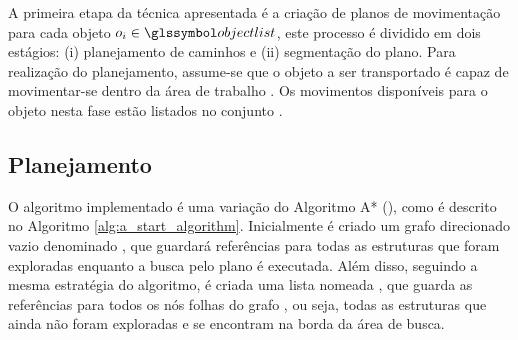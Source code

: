 A primeira etapa da técnica apresentada é a criação de planos de movimentação para cada objeto $\object{i} \in \sy{objectlist}$, este processo é dividido em dois estágios: (i) planejamento de caminhos e (ii) segmentação do plano.
Para realização do planejamento, assume-se que o objeto a ser transportado é capaz de movimentar-se dentro da área de trabalho .
Os movimentos disponíveis para o objeto nesta fase estão listados no conjunto .


\subsection{Planejamento} %
\label{sub:planejamento}


O algoritmo implementado é uma variação do Algoritmo A* (\cite{Hart1968}), como é descrito no Algoritmo \ref{alg:a_start_algorithm}.
Inicialmente é criado um grafo direcionado vazio denominado , que guardará referências para todas as estruturas  que foram exploradas enquanto a busca pelo plano é executada.
Além disso, seguindo a mesma estratégia do algoritmo, é criada uma lista nomeada , que guarda as referências para todos os nós folhas do grafo , ou seja, todas as estruturas  que ainda não foram exploradas e se encontram na borda da área de busca.

